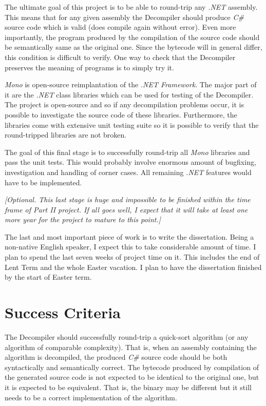 \begin{enumerate}
The ultimate goal of this project is to be able to round-trip any 
\emph{.NET} assembly.  This means that for any given assembly the 
Decompiler should produce \emph{C\#} source code which is valid (does 
compile again without error).  Even more importantly, the program produced 
by the compilation of the source code should be semantically same as the 
original one.  Since the bytecode will in general differ, this condition is 
difficult to verify.  One way to check that the Decompiler preserves the 
meaning of programs is to simply try it.

\emph{Mono} is open-source reimplantation of the \emph{.NET Framework}.
The major part of it are the \emph{.NET} class libraries which can be 
used for testing of the Decompiler.  The project is open-source and so if 
any decompilation problems occur, it is possible to investigate the 
source code of these libraries.  Furthermore, the libraries come with 
extensive unit testing suite so it is possible to verify that the 
round-tripped libraries are not broken.

The goal of this final stage is to successfully round-trip all \emph{Mono} 
libraries and pass the unit tests.  This would probably involve enormous 
amount of bugfixing, investigation and handling of corner cases.  All 
remaining \emph{.NET} features would have to be implemented.

\emph{[Optional.  This last stage is huge and impossible to be finished 
within the time frame of Part II project.  If all goes well, I expect 
that it will take at least one more year for the project to mature to 
this point.]}

The last and most important piece of work is to write the dissertation.
Being a non-native English speaker, I expect this to take considerable
amount of time.  I plan to spend the last seven weeks of project time
on it.  This includes the end of Lent Term and the whole Easter vacation.
I plan to have the dissertation finished by the start of Easter term.

\end{enumerate}

\newpage

\section*{Success Criteria}
The Decompiler should successfully round-trip a quick-sort algorithm 
(or any algorithm of comparable complexity). 
That is, when an assembly containing the algorithm is 
decompiled, the produced \emph{C\#} source code should be both 
syntactically and semantically correct.  The bytecode produced
by compilation of the generated source code is not expected to be
identical to the original one, but it is expected to be equivalent.
That is, the binary may be different but it still needs to be a correct 
implementation of the algorithm.

